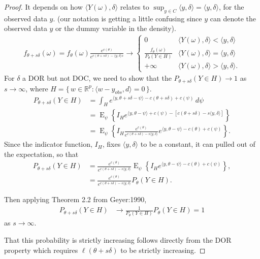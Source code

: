 \documentclass{amsbook}
\DeclareMathOperator{\E}{E}
\def\RR{{\mathbb R}}
\newcommand{\set}[1]{\{\,#1\,\}}
\newcommand{\inner}[1]{\langle #1 \rangle}
\theoremstyle{definition}
\theoremstyle{remark}
\begin{document}
\begin{proof}
It depends on how $\inner{Y(\omega),\delta}$ relates to $\sup_{y \in C}\inner{y,
\delta} = \inner{y,\delta}$, for the observed data $y$.  (our notation is getting a 
little confusing since $y$ can denote the observed data $y$ or the dummy variable in 
the density).  
\begin{align*}
	f_{\theta+s\delta}(\omega) = f_\theta(\omega) \frac{e^{c(\theta)}}{e^{ c(\theta+s
\delta) - \inner{y,\delta}s } } 
	\to	
			\begin{cases} 
			0 								& \inner{Y(\omega),\delta} < \inner{y,
\delta} \\
			\frac{f_\theta(\omega)}{P_\theta(Y \in H)} 	& \inner{Y(\omega) ,
\delta} = \inner{y,\delta} \\
			+\infty							& \inner{Y(\omega),\delta} > \inner{y,
\delta}.
	\end{cases}
\end{align*}
For $\delta$ a DOR but not DOC, we need to show that the $P_{\theta+s\delta}(Y \in H) \to 1$ 
as $s \to \infty$, where $H = \set{w \in \RR^p: \inner{w-y_{obs},d}=0}$.
\begin{align*}
 P_{\theta+s\delta}(Y \in H) &= \int_H e^{\inner{y, \theta+s\delta - \psi} - c(\theta
+s\delta) + c(\psi)} \, d\psi \\
		&= \E_\psi \left \{ I_H e^{\inner{y, \theta - \psi} +c(\psi) - [c(\theta+s\delta) -s\inner{y,\delta}]} \right 
\}\\
		&= \E_\psi \left \{ I_H  \frac{e^{c(\theta)} }{ e^{ c(\theta+s\delta) -s\inner{y,\delta} } } 
		e^{\inner{y, \theta - \psi} -c(\theta)+c(\psi)}  \right \}.
\end{align*}
Since the indicator function, $I_H$, fixes $\inner{ y, \delta}$ to be a constant, it can pulled out of the expectation, so that 
\begin{align*}
		 P_{\theta+s\delta}(Y \in H)
		 &= \frac{e^{c(\theta)} }{ e^{ c(\theta+s\delta) -s\inner{y,\delta} } }
		 \E_\psi \left \{ I_H   
		e^{\inner{y, \theta - \psi} -c(\theta)+c(\psi)}  \right \}, \\
		 &= \frac{e^{c(\theta)} }{ e^{ c(\theta+s\delta) -s\inner{y,\delta} } } 
		 P_\theta ( Y \in H ).
		 \end{align*}
 
Then applying Theorem 2.2 from Geyer:1990,
\begin{align*}
 P_{\theta+s\delta}(Y \in H)
		&\to \frac{1}{P_\theta(Y \in H)}  P_{\theta}(Y \in H) = 1
 \end{align*}
 as $s \to \infty$.  
 
 That this probability is strictly increasing follows directly from the DOR property which requires $\ell( \theta+s
\delta)$ to be strictly increasing.   
\end{proof}
\end{document}
